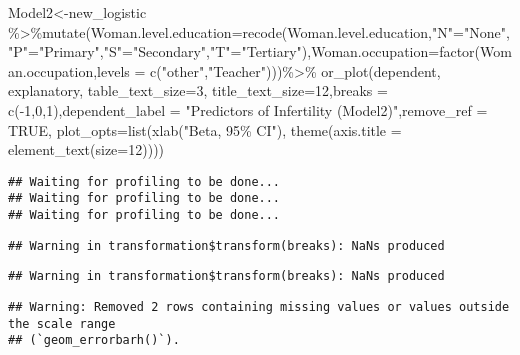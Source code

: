 \documentclass[
]{article}
\newenvironment{Shaded}{\begin{snugshade}}{\end{snugshade}}
\newcommand{\AttributeTok}[1]{\textcolor[rgb]{0.77,0.63,0.00}{#1}}
\newcommand{\ConstantTok}[1]{\textcolor[rgb]{0.00,0.00,0.00}{#1}}
\newcommand{\DecValTok}[1]{\textcolor[rgb]{0.00,0.00,0.81}{#1}}
\newcommand{\FunctionTok}[1]{\textcolor[rgb]{0.00,0.00,0.00}{#1}}
\newcommand{\NormalTok}[1]{#1}
\newcommand{\OtherTok}[1]{\textcolor[rgb]{0.56,0.35,0.01}{#1}}
\newcommand{\SpecialCharTok}[1]{\textcolor[rgb]{0.00,0.00,0.00}{#1}}
\newcommand{\StringTok}[1]{\textcolor[rgb]{0.31,0.60,0.02}{#1}}
\begin{document}
\begin{Shaded}
\begin{Highlighting}[]
\NormalTok{Model2}\OtherTok{\textless{}{-}}\NormalTok{new\_logistic }\SpecialCharTok{\%\textgreater{}\%}\FunctionTok{mutate}\NormalTok{(}\AttributeTok{Woman.level.education=}\FunctionTok{recode}\NormalTok{(Woman.level.education,}\StringTok{"N"}\OtherTok{=}\StringTok{"None"}\NormalTok{,}\StringTok{"P"}\OtherTok{=}\StringTok{"Primary"}\NormalTok{,}\StringTok{"S"}\OtherTok{=}\StringTok{"Secondary"}\NormalTok{,}\StringTok{"T"}\OtherTok{=}\StringTok{"Tertiary"}\NormalTok{),}\AttributeTok{Woman.occupation=}\FunctionTok{factor}\NormalTok{(Woman.occupation,}\AttributeTok{levels =} \FunctionTok{c}\NormalTok{(}\StringTok{"other"}\NormalTok{,}\StringTok{"Teacher"}\NormalTok{)))}\SpecialCharTok{\%\textgreater{}\%}
    \FunctionTok{or\_plot}\NormalTok{(dependent, explanatory, }\AttributeTok{table\_text\_size=}\DecValTok{3}\NormalTok{, }
            \AttributeTok{title\_text\_size=}\DecValTok{12}\NormalTok{,}\AttributeTok{breaks =} \FunctionTok{c}\NormalTok{(}\SpecialCharTok{{-}}\DecValTok{1}\NormalTok{,}\DecValTok{0}\NormalTok{,}\DecValTok{1}\NormalTok{),}\AttributeTok{dependent\_label =} \StringTok{"Predictors of Infertility (Model2)"}\NormalTok{,}\AttributeTok{remove\_ref =} \ConstantTok{TRUE}\NormalTok{,}
            \AttributeTok{plot\_opts=}\FunctionTok{list}\NormalTok{(}\FunctionTok{xlab}\NormalTok{(}\StringTok{"Beta, 95\% CI"}\NormalTok{),}
                           \FunctionTok{theme}\NormalTok{(}\AttributeTok{axis.title =} \FunctionTok{element\_text}\NormalTok{(}\AttributeTok{size=}\DecValTok{12}\NormalTok{))))}
\end{Highlighting}
\end{Shaded}

\begin{verbatim}
## Waiting for profiling to be done...
## Waiting for profiling to be done...
## Waiting for profiling to be done...
\end{verbatim}

\begin{verbatim}
## Warning in transformation$transform(breaks): NaNs produced
\end{verbatim}

\begin{verbatim}
## Warning in transformation$transform(breaks): NaNs produced
\end{verbatim}

\begin{verbatim}
## Warning: Removed 2 rows containing missing values or values outside the scale range
## (`geom_errorbarh()`).
\end{verbatim}
\end{document}
